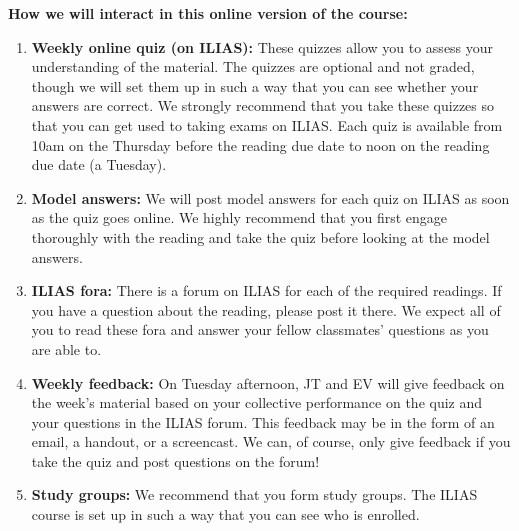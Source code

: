 \documentclass[11pt,fleqn,a4]{article}
\newcommand{\6}{\mbox{$[\hspace*{-.6mm}[$}}
\newcommand{\9}{\mbox{$]\hspace*{-.6mm}]$}}
\begin{document}
\newpage

{\bf How we will interact in this online version of the course:}

\begin{enumerate}[topsep=-3pt,itemsep=-1pt]

\item {\bf Weekly online quiz (on ILIAS):} These quizzes allow you to assess your understanding of the material. The quizzes are optional and not graded, though we will set them up in such a way that you can see whether your answers are correct. We strongly recommend that you take these quizzes so that you can get used to taking exams on ILIAS. Each quiz is available from 10am on the Thursday before the reading due date to noon on the reading due date (a Tuesday). 

\item {\bf Model answers:} We will post model answers for each quiz on ILIAS as soon as the quiz goes online. We highly recommend that you  first engage thoroughly with the reading and take the quiz before looking at the model answers. 

\item {\bf ILIAS fora:} There is a forum on ILIAS for each of the required readings. If you have a question about the reading, please post it there. We expect all of you to read these fora and answer your fellow classmates' questions as you are able to. 

\item {\bf Weekly feedback:} On Tuesday afternoon, JT and EV will give feedback on the week's material based on your collective performance on the quiz and your questions in the ILIAS forum. This feedback may be in the form of an email, a handout, or a screencast. We can, of course, only give feedback if you take the quiz and post questions on the forum! 

\item {\bf Study groups:} We recommend that you form study groups. The ILIAS course is set up in such a way that you can see who is enrolled.


\end{enumerate}

\end{document}
